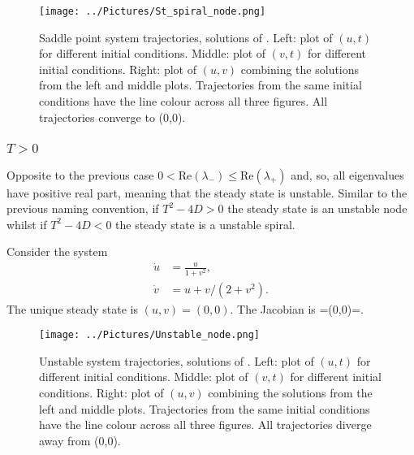 \begin{figure}[!!!h!!!tb]
\centering
\texttt{[image: ../Pictures/St\_spiral\_node.png]}
\caption{\label{St_spiral_node}Saddle point system trajectories, solutions of . Left: plot of $(u,t)$ for different initial conditions. Middle: plot of $(v,t)$ for different initial conditions. Right: plot of $(u,v)$ combining the solutions from the left and middle plots. Trajectories from the same initial conditions have the line colour across all three figures. All trajectories converge to (0,0).}
\end{figure}
\subsubsection{$T>0$}
Opposite to the previous case $0<\textrm{Re}(\lambda_-)\leq \textrm{Re}(\lambda_+)$ and, so, all eigenvalues have positive real part, meaning that the steady state is unstable. Similar to the previous naming convention, if $T^2-4D>0$ the steady state is an unstable node whilst if $T^2-4D<0$ the steady state is a unstable spiral.
\begin{example}[frametitle=Unstable node]
Consider the system
\begin{align}
\dot{u}&=\frac{u}{1+v^2},\label{Unstable_1}\\
\dot{v}&=u+v/(2+v^2)\label{Unstable_2}.
\end{align}
The unique steady state is $(u,v)=(0,0)$. The Jacobian is
\bb
{}= \implies {}(0,0)=.
\ee
{}
\end{example}
\begin{figure}[!!!h!!!tb]
\centering
\texttt{[image: ../Pictures/Unstable\_node.png]}
\caption{\label{Unstable_node}Unstable system trajectories, solutions of . Left: plot of $(u,t)$ for different initial conditions. Middle: plot of $(v,t)$ for different initial conditions. Right: plot of $(u,v)$ combining the solutions from the left and middle plots. Trajectories from the same initial conditions have the line colour across all three figures. All trajectories diverge away from (0,0).}
\end{figure}
